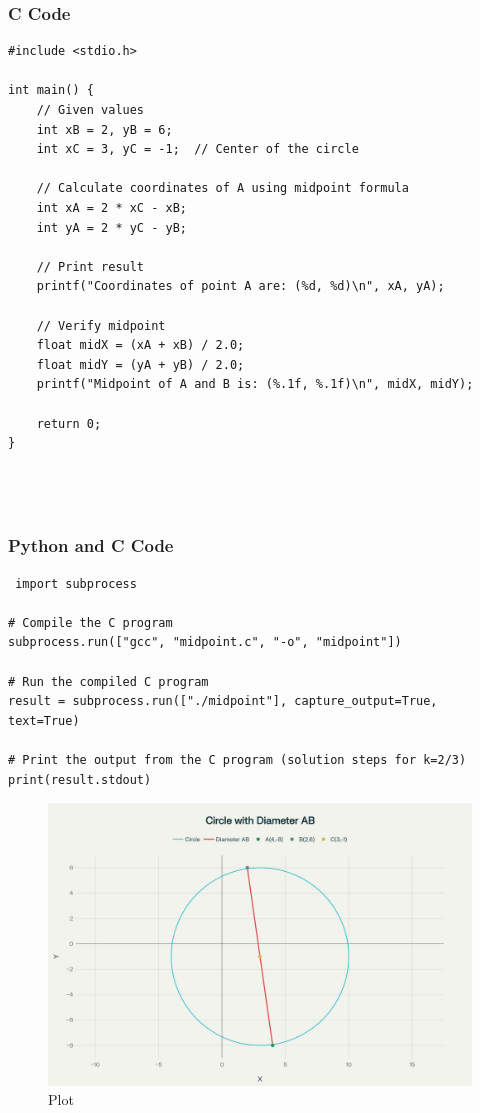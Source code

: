 \documentclass{beamer}
\begin{document}
 



 


\begin{frame}[fragile]
\frametitle{C Code}
\begin{lstlisting}
#include <stdio.h>

int main() {
    // Given values
    int xB = 2, yB = 6;
    int xC = 3, yC = -1;  // Center of the circle

    // Calculate coordinates of A using midpoint formula
    int xA = 2 * xC - xB;
    int yA = 2 * yC - yB;

    // Print result
    printf("Coordinates of point A are: (%d, %d)\n", xA, yA);

    // Verify midpoint
    float midX = (xA + xB) / 2.0;
    float midY = (yA + yB) / 2.0;
    printf("Midpoint of A and B is: (%.1f, %.1f)\n", midX, midY);

    return 0;
}




\end{lstlisting}

\end{frame}


\begin{frame}[fragile]
\frametitle{Python and C Code}

\begin{lstlisting}
 import subprocess

# Compile the C program
subprocess.run(["gcc", "midpoint.c", "-o", "midpoint"])

# Run the compiled C program
result = subprocess.run(["./midpoint"], capture_output=True, text=True)

# Print the output from the C program (solution steps for k=2/3)
print(result.stdout) 

\end{lstlisting}

\end{frame}

 


\begin{figure}
    \centering
    \includegraphics[width=0.8\columnwidth]{Fig.png}
    \caption{Plot}
    \label{fig:placeholder}
\end{figure}
\end{document}
